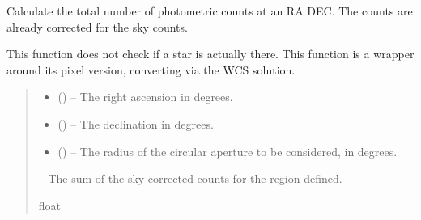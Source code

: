 \documentclass[letterpaper,11pt,english]{sphinxmanual}
\begin{document}
\begin{savenotes}
\begin{fulllineitems}
\begin{savenotes}\begin{fulllineitems}
\label{\detokenize{code/opihiexarata.photometry.solution:opihiexarata.photometry.solution.PhotometricSolution._calculate_star_photon_counts_coordinate}}
\pysigstartsignatures
{}
\pysigstopsignatures
\sphinxAtStartPar
Calculate the total number of photometric counts at an RA DEC. The
counts are already corrected for the sky counts.

\sphinxAtStartPar
This function does not check if a star is actually there. This function
is a wrapper around its pixel version, converting via the WCS solution.
\begin{quote}\begin{description}
\begin{itemize}
\item {} 
\sphinxAtStartPar
{} () – The right ascension in degrees.

\item {} 
\sphinxAtStartPar
{} () – The declination in degrees.

\item {} 
\sphinxAtStartPar
{} () – The radius of the circular aperture to be considered, in degrees.

\end{itemize}

\sphinxAtStartPar
{} – The sum of the sky corrected counts for the region defined.

\sphinxAtStartPar
float

\end{description}\end{quote}

\end{fulllineitems}\end{savenotes}


\end{fulllineitems}
\end{savenotes}
\end{document}
